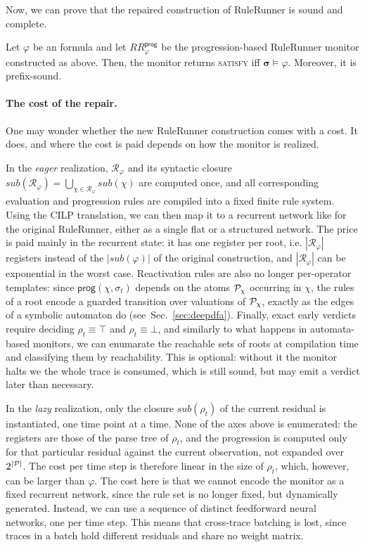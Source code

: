 Now, we can prove that the repaired construction of RuleRunner is sound and complete.

\begin{theorem}
\label{thm:rulerunner-progression-correct}
Let $\varphi$ be an \ltlf formula and let $RR^{\mathsf{prog}}_\varphi$ be the progression-based RuleRunner monitor constructed as above. Then, the monitor returns \textsc{satisfy} iff $\boldsymbol{\sigma}\models\varphi$. Moreover, it is prefix-sound.
\end{theorem}


\paragraph{The cost of the repair.}
One may wonder whether the new RuleRunner construction comes with a cost. It does, and where the cost is paid depends on how the monitor is realized.

In the \emph{eager} realization, $\mathcal R_\varphi$ and its syntactic closure $sub(\mathcal R_\varphi)=\bigcup_{\chi\in\mathcal R_\varphi}sub(\chi)$ are computed once, and all corresponding evaluation and progression rules are compiled into a fixed finite rule system. Using the CILP translation, we can then map it to a recurrent network like for the original RuleRunner, either as a single flat or a structured network.
The price is paid mainly in the recurrent state: it has one register per root, i.e. $|\mathcal R_\varphi|$ registers instead of the $|sub(\varphi)|$ of the original construction, and $|\mathcal R_\varphi|$ can be exponential in the worst case. Reactivation rules are also no longer per-operator templates: since $\mathsf{prog}(\chi,\sigma_t)$ depends on the atoms ${\mathcal{P}}_\chi$ occurring in $\chi$, the rules of a root encode a guarded transition over valuations of ${\mathcal{P}}_\chi$, exactly as the edges of a symbolic automaton do (see\ Sec.~\ref{sec:deepdfa}). Finally, exact early verdicts require deciding $\rho_t\equiv\top$ and $\rho_t\equiv\bot$, and similarly to what happens in automata-based monitors, we can enumarate the reachable sets of roots at compilation time and classifying them by reachability. This is optional: without it the monitor halts we the whole trace is consumed, which is still sound, but may emit a verdict later than necessary.

In the \emph{lazy} realization, only the closure $sub(\rho_t)$ of the current residual is instantiated, one time point at a time. None of the axes above is enumerated: the registers are those of the parse tree of $\rho_t$, and the progression is computed only for that particular residual against the current observation, not expanded over $2^{|{\mathcal{P}}|}$. The cost per time step is therefore linear in the size of $\rho_t$, which, however, can be larger than $\varphi$. 
The cost here is that we cannot encode the monitor as a fixed recurrent network, since the rule set is no longer fixed, but dynamically generated. Instead, we can use a sequence of distinct feedforward neural networks, one per time step. This means that cross-trace batching is lost, since traces in a batch hold different residuals and share no weight matrix.


